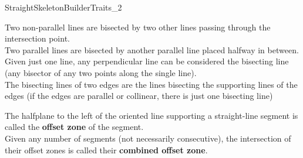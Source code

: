 
\begin{ccRefConcept}{StraightSkeletonBuilderTraits_2}



Two non-parallel lines are bisected by two other lines passing through the intersection point.\\ Two parallel lines are bisected by another parallel line placed halfway in between.\\
Given just one line, any perpendicular line can be considered the bisecting line (any bisector of any two points along the single line).\\
The bisecting lines of two edges are the lines bisecting the supporting lines of the edges (if the edges are parallel or collinear, there is just one bisecting line)

The halfplane to the left of the oriented line supporting a straight-line segment is called the \textbf{offset zone} of the segment.\\
Given any number of segments (not necessarily consecutive), the intersection of their offset zones is called their \textbf{combined offset zone}.


\end{ccRefConcept}
